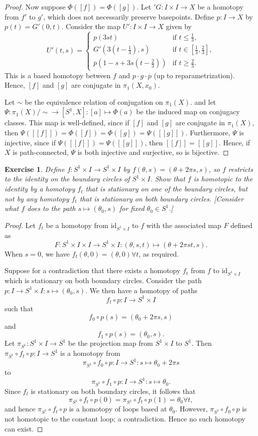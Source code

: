 \documentclass{article}
\newtheorem{exercise}{Exercise}[subsection]
\begin{document}
\begin{proof}
Now suppose $\Phi([f])=\Phi([g])$. Let $'G:I\times I\to X$ be a homotopy from $f'$ to $g'$, which does not necessarily preserve basepoints. Define $p:I\to X$ by $p(t)=G'(0,t)$. Consider the map $U':I\times I\to X$ given by\[U'(t,s)=\begin{cases}
    p(3st)&\text{if }t\leq\frac{1}{3},\\
    G'(3(t-\frac{1}{3}),s)&\text{if }t\in[\frac{1}{3},\frac{2}{3}],\\
    \overline{p}(1-s+3s(t-\frac{2}{3}))&\text{if }t\geq\frac{2}{3}.
\end{cases}\] This is a based homotopy between $f$ and $p\cdot g\cdot\overline{p}$ (up to reparametrization). Hence, $[f]$ and $[g]$ are conjugate in $\pi_1(X,x_0)$.

Let $\sim$ be the equivalence relation of conjugation on $\pi_1(X)$. and let $\Psi:\pi_1(X)/\sim\to[S^1,X]:[a]\mapsto\Phi(a)$ be the induced map on conjugacy classes. This map is well-defined, since if $[f]$ and $[g]$ are conjugate in $\pi_1(X)$, then $\Psi([[f]])=\Phi([f])=\Phi([g])=\Psi([[g]])$. Furthermore, $\Psi$ is injective, since if $\Psi([[f]])=\Psi([[g]])$, then $[[f]]=[[g]]$. Hence, if $X$ is path-connected, $\Psi$ is both injective and surjective, so is bijective.
\end{proof}

\begin{exercise}
Define $f:S^1\times I\to S^1\times I$ by $f(\theta,s)=(\theta+2\pi s,s)$, so $f$ restricts to the identity on the boundary circles of $S^1\times I$. Show that $f$ is homotopic to the identity by a homotopy $f_t$ that is stationary on one of the boundary circles, but not by any homotopy $f_t$ that is stationary on both boundary circles. [Consider what $f$ does to the path $s\mapsto(\theta_0,s)$ for fixed $\theta_0\in S^1$.]
\end{exercise}
\begin{proof}
Let $f_t$ be a homotopy from $\text{id}_{S^1\times I}$ to $f$ with the associated map $F$ defined as \[F:S^1\times I\times I\to S^1\times I:(\theta,s,t)\mapsto(\theta+2\pi st,s).\] When $s=0$, we have $f_t(\theta,0)=(\theta,0)\forall t$, as required.

Suppose for a contradiction that there exists a homotopy $f_t$ from $f$ to $\text{id}_{S^1\times I}$ which is stationary on both boundary circles. 
Consider the path $p:I\to S^1\times I:s\mapsto(\theta_0,s)$. We then have a homotopy of paths \[f_t\circ p:I\to S^1\times I\] such that \[f_0\circ p(s)=(\theta_0+2\pi s,s)\] and \[f_1\circ p(s)=(\theta_0,s).\] Let $\pi_{S^1}:S^1\times I\to S^1$ be the projection map from $S^1\times I$ to $S^1$. Then $\pi_{S^1}\circ f_t\circ p:I\to S^1$ is a homotopy from \[\pi_{S^1}\circ f_0\circ p:I\to S^1:s\mapsto\theta_0+2\pi s\] to \[\pi_{S^1}\circ f_1\circ p:I\to S^1:s\mapsto\theta_0.\] Since $f_t$ is stationary on both boundary circles, it follows that \[\pi_{S^1}\circ f_t\circ p(0)=\pi_{S^1}\circ f_t\circ p(1)=\theta_0\forall t,\] and hence $\pi_{S^1}\circ f_t\circ p$ is a homotopy of loops based at $\theta_0$. However, $\pi_{S^1}\circ f_0\circ p$ is not homotopic to the constant loop; a contradiction. Hence no such homotopy can exist.
\end{proof}
\end{document}

